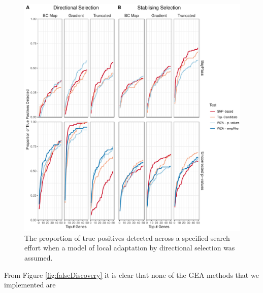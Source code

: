 \documentclass[11pt,twoside,lineno]{GSA_format}
\begin{document}
\begin{figure}[H]
  \includegraphics[width=\linewidth]{Plots/UncorrectedBayPassComparison_TruePositives.pdf} 
  \caption{The proportion of true positives detected across a specified search effort when a model of local adaptation  by directional selection was assumed.}

  \label{fig:truePosDirectional}
\end{figure}

From Figure \ref{fig:falseDiscovery} it is clear that none of the GEA methods that we implemented are 
\end{document}
